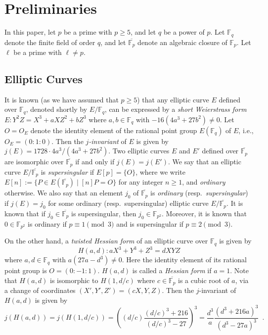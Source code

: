 \documentclass{article}
\theoremstyle{definition}
\newcommand{\FF}{\mathbb{F}}
\begin{document}
\section{Preliminaries}
\label{sec:preliminaries}

In this paper, let $p$ be a prime with $p \geq 5$, and let $q$ be a power of $p$.
Let $\FF_q$ denote the finite field of order $q$, and let $\overline{\FF_p}$ denote an algebraic closure of $\FF_p$.
Let $\ell$ be a prime with $\ell \neq p$.


\subsection{Elliptic Curves}
\label{sec:preliminaries:EC}

It is known (as we have assumed that $p \geq 5$) that any elliptic curve $E$ defined over $\FF_q$, denoted shortly by $E/\FF_q$, can be expressed by a \emph{short Weierstrass form} $E \colon Y^2 Z = X^3 + a X Z^2 + b Z^3$ where $a,b \in \FF_q$ with $-16 (4 a^3 + 27 b^2) \neq 0$.
Let $O = O_E$ denote the identity element of the rational point group $E(\FF_q)$ of $E$, i.e., $O_E = (0:1:0)$.
Then the \emph{$j$-invariant} of $E$ is given by $j(E) = 1728 \cdot 4 a^3 / (4 a^3 + 27 b^2)$.
Two elliptic curves $E$ and $E'$ defined over $\overline{\FF_p}$ are isomorphic over $\overline{\FF_p}$ if and only if $j(E) = j(E')$.
We say that an elliptic curve $E/\overline{\FF_p}$ is \emph{supersingular} if $E[p] = \{O\}$, where we write $E[n] := \{ P \in E(\overline{\FF_p}) \mid [n] P = O \}$ for any integer $n \geq 1$, and \emph{ordinary} otherwise.
We also say that an element $j_0$ of $\overline{\FF_p}$ is \emph{ordinary} (resp.\ \emph{supersingular}) if $j(E) = j_0$ for some ordinary (resp.\ supersingular) elliptic curve $E/\overline{\FF_p}$.
It is known \cite[Theorem V.3.1]{Silverman:AEC} that if $j_0 \in \overline{\FF_p}$ is supersingular, then $j_0 \in \FF_{p^2}$.
Moreover, it is known \cite[Example V.4.4]{Silverman:AEC} that $0 \in \FF_{p^2}$ is ordinary if $p \equiv 1 \pmod{3}$ and is supersingular if $p \equiv 2 \pmod{3}$.

On the other hand, a \emph{twisted Hessian form} \cite{LC:BCKL15} of an elliptic curve over $\FF_q$ is given by
\[
H(a,d) \colon a X^3 + Y^3 + Z^3 = d X Y Z
\]
where $a,d \in \FF_q$ with $a (27a - d^3) \neq 0$.
Here the identity element of its rational point group is $O = (0:-1:1)$.
$H(a,d)$ is called a \emph{Hessian form} if $a = 1$.
Note that $H(a,d)$ is isomorphic to $H(1,d/c)$ where $c \in \overline{\FF_p}$ is a cubic root of $a$, via a change of coordinates $(X',Y',Z') = (cX,Y,Z)$.
Then the $j$-invariant of $H(a,d)$ is given \cite{farashahi2011numberdistinctlegendrejacobi} by
\begin{equation}
\label{eq:j-invariant_Hesse}
j(H(a,d))
= j(H(1,d/c))
= \left( (d/c) \frac{ (d/c)^3 + 216 }{ (d/c)^3 - 27 } \right)^3
= \frac{ d^3 }{ a } \frac{ ( d^3 + 216a )^3 }{ (d^3 - 27a)^3 } \enspace.
\end{equation}
\end{document}
